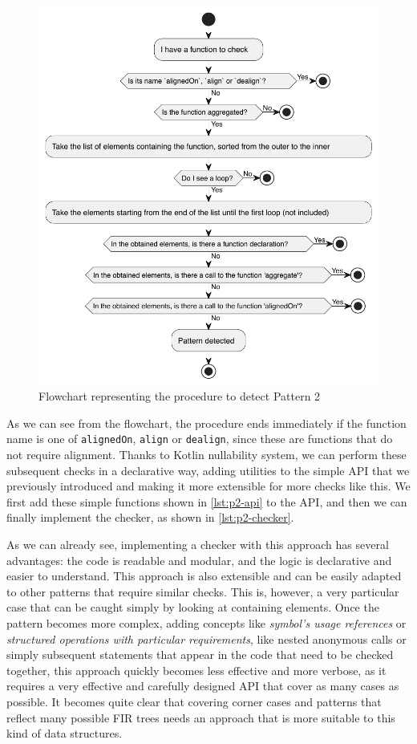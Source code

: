 \documentclass[12pt,a4paper,openright,twoside]{book}
\begin{document}
\begin{figure}
  \centering
  \includegraphics[width=.6\linewidth]{figures/p2-flowchart.pdf}
  \caption{Flowchart representing the procedure to detect Pattern 2}
  \label{fig:p2-flowchart}
\end{figure}

As we can see from the flowchart, the procedure ends immediately if the function
name is one of \lstinline{alignedOn}, \lstinline{align} or \lstinline{dealign},
since these are functions that do not require alignment. Thanks to Kotlin 
nullability system, we can perform these subsequent checks in a declarative way,
adding utilities to the simple API that we previously introduced and making it 
more extensible for more checks like this.
%
We first add these simple functions shown in \cref{lst:p2-api} to the API, and
then we can finally implement the checker, as shown in \cref{lst:p2-checker}. 





As we can already see, implementing a checker with this approach has several
advantages: the code is readable and modular, and the logic is
declarative and easier to understand. This approach is also extensible and
can be easily adapted to other patterns that require similar checks.
%
This is, however, a very particular case that can be caught simply by looking at
containing elements. Once the pattern becomes more complex, adding concepts like
\emph{symbol's usage references} or \emph{structured operations with particular
requirements}, like nested anonymous calls or simply subsequent statements that
appear in the code that need to be checked together, this approach quickly
becomes less effective and more verbose, as it requires a very effective and
carefully designed API that cover as many cases as possible. 
%
It becomes quite clear that covering corner cases and patterns that reflect many
possible \ac{FIR} trees needs an approach that is more suitable to this kind of
data structures.
\end{document}
